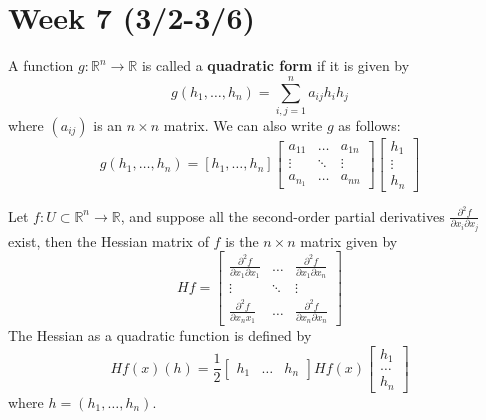 \documentclass[openany]{book}
\newcommand{\R}{\mathbb{R}}
\begin{document}
\section*{\centering Week 7 (3/2-3/6)}


\begin{defn}
    A function $g:\R^n\to\R$ is called a \textbf{quadratic form} if it is given by 
    \begin{equation*}
        g(h_1,\dots, h_n)=\sum_{i,j=1}^na_{ij}h_ih_j
    \end{equation*}
    where $(a_{ij})$ is an $n\times n$ matrix. We can also write $g$ as follows:
    \begin{equation*}
        g(h_1,\dots,h_n)=[h_1,\dots,h_n]\begin{bmatrix}
            a_{11}&\dots &a_{1n}\\
            \vdots&\ddots &\vdots\\
            a_{n_1}&\dots&a_{nn}
        \end{bmatrix}\begin{bmatrix}
            h_1\\
            \vdots\\
            h_n
        \end{bmatrix}
    \end{equation*}

\end{defn}

\begin{defn}
    Let $f:U\subset\R^n\to\R$, and suppose all the second-order partial derivatives $\frac{\partial^2 f}{\partial x_i\partial x_j}$ exist, then the Hessian matrix of $f$ is the $n\times n$ matrix given by 
    \begin{equation*}
        Hf=\begin{bmatrix}
            \frac{\partial^2 f}{\partial x_1\partial x_1}&\dots&\frac{\partial^2f}{\partial x_1\partial x_n}\\
            \vdots&\ddots&\vdots\\
            \frac{\partial^2f}{\partial x_nx_1}&\dots&\frac{\partial^2f}{\partial x_n\partial x_n}
        \end{bmatrix}
    \end{equation*}
    The Hessian as a quadratic function is defined by 
    \begin{equation*}
        Hf(x)(h)=\frac{1}{2}\begin{bmatrix}
            h_1&\dots&h_n
        \end{bmatrix}Hf(x)\begin{bmatrix}
            h_1\\
            \dots\\
            h_n
        \end{bmatrix}
    \end{equation*}
    where $h=(h_1,\dots,h_n)$.
\end{defn}
\end{document}
